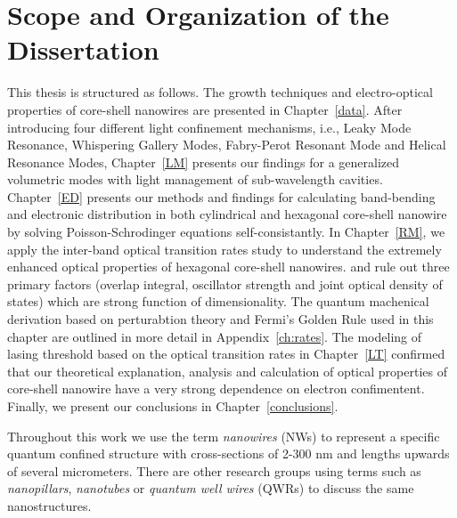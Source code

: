 \section{Scope and Organization of the Dissertation}

This thesis is structured as follows. The growth techniques and electro-optical
properties of core-shell nanowires are presented in Chapter~\ref{data}.  After
introducing four different light confinement mechanisms, i.e., Leaky Mode
Resonance, Whispering Gallery Modes, Fabry-Perot Resonant Mode and Helical
Resonance Modes, Chapter~\ref{LM} presents our findings for a generalized
volumetric modes with light management of sub-wavelength cavities.
Chapter~\ref{ED} presents our methods and findings for calculating band-bending
and electronic distribution in both cylindrical and hexagonal core-shell
nanowire by solving Poisson-Schrodinger equations self-consistantly.  In
Chapter~\ref{RM}, we apply the inter-band optical transition rates study to
understand the extremely enhanced optical properties of hexagonal core-shell
nanowires. and rule out three primary factors (overlap integral, oscillator
strength and joint optical density of states) which are strong function of
dimensionality.  The quantum machenical derivation based on perturabtion theory
and Fermi's Golden Rule used in this chapter are outlined in more detail in
Appendix~\ref{ch:rates}. The modeling of lasing threshold based on the optical
transition rates in Chapter~\ref{LT} confirmed that our theoretical
explanation, analysis and calculation of optical properties of core-shell
nanowire have a very strong dependence on electron confimentent. Finally, we
present our conclusions in Chapter~\ref{conclusions}. 

Throughout this work we use the term  {\em nanowires} (NWs) to represent a
specific quantum confined structure with cross-sections of 2-300 nm and lengths
upwards of several micrometers. There are other research groups using terms
such as {\em nanopillars}, {\em nanotubes} or {\em quantum well wires} (QWRs) to discuss the
same nanostructures.
